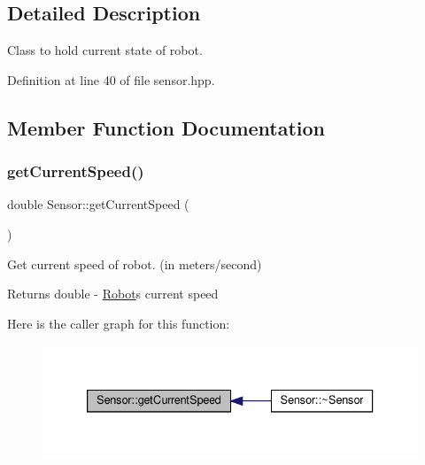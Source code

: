 \subsection{Detailed Description}
Class to hold current state of robot. 

Definition at line 40 of file sensor.\+hpp.



\subsection{Member Function Documentation}
\mbox{\label{classSensor_afea96ceec4830e07ed61f4ec12e45dec}} 
\subsubsection{\texorpdfstring{get\+Current\+Speed()}{getCurrentSpeed()}}
{\footnotesize\ttfamily double Sensor\+::get\+Current\+Speed (\begin{DoxyParamCaption}{ }\end{DoxyParamCaption})}



Get current speed of robot. (in meters/second) 

\begin{DoxyReturn}{Returns}
double -\/ \hyperlink{classRobot}{Robot}\textquotesingle{}s current speed 
\end{DoxyReturn}
Here is the caller graph for this function\+:
\nopagebreak
\begin{figure}[H]
\begin{center}
\leavevmode
\includegraphics[width=333pt]{classSensor_afea96ceec4830e07ed61f4ec12e45dec_icgraph}
\end{center}
\end{figure}
\mbox{\label{classSensor_a5bf3c3f5dfa3048bb702b5d3164bd410}} 

